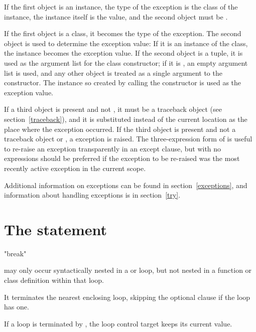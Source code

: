 If the first object is an instance, the type of the exception is the
class of the instance, the instance itself is the value, and the
second object must be .

If the first object is a class, it becomes the type of the exception.
The second object is used to determine the exception value: If it is
an instance of the class, the instance becomes the exception value.
If the second object is a tuple, it is used as the argument list for
the class constructor; if it is , an empty argument list is
used, and any other object is treated as a single argument to the
constructor.  The instance so created by calling the constructor is
used as the exception value.

If a third object is present and not , it must be a
traceback object (see section~\ref{traceback}), and
it is substituted instead of the current location as the place where
the exception occurred.  If the third object is present and not a
traceback object or , a  exception is
raised.  The three-expression form of  is useful to
re-raise an exception transparently in an except clause, but
 with no expressions should be preferred if the
exception to be re-raised was the most recently active exception in
the current scope.

Additional information on exceptions can be found in
section~\ref{exceptions}, and information about handling exceptions is
in section~\ref{try}.


\section{The  statement \label{break}}

\begin{productionlist}
             {"break"}
\end{productionlist}

 may only occur syntactically nested in a 
or  loop, but not nested in a function or class definition
within that loop.

It terminates the nearest enclosing loop, skipping the optional
 clause if the loop has one.

If a  loop is terminated by , the loop control
target keeps its current value.

